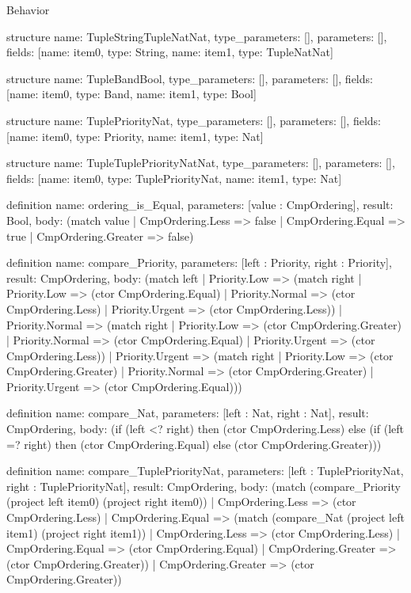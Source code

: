 \begin{lexlean}{Behavior}
\begin{semanticmodule}
structure{
  name: TupleStringTupleNatNat,
  type_parameters: [],
  parameters: [],
  fields: [{name: item0, type: String}, {name: item1, type: TupleNatNat}]
}

structure{
  name: TupleBandBool,
  type_parameters: [],
  parameters: [],
  fields: [{name: item0, type: Band}, {name: item1, type: Bool}]
}

structure{
  name: TuplePriorityNat,
  type_parameters: [],
  parameters: [],
  fields: [{name: item0, type: Priority}, {name: item1, type: Nat}]
}

structure{
  name: TupleTuplePriorityNatNat,
  type_parameters: [],
  parameters: [],
  fields: [{name: item0, type: TuplePriorityNat}, {name: item1, type: Nat}]
}

definition{
  name: ordering_is_Equal,
  parameters: [value : CmpOrdering],
  result: Bool,
  body: (match value
    | CmpOrdering.Less => false
    | CmpOrdering.Equal => true
    | CmpOrdering.Greater => false)
}

definition{
  name: compare_Priority,
  parameters: [left : Priority, right : Priority],
  result: CmpOrdering,
  body: (match left
    | Priority.Low => (match right
      | Priority.Low => (ctor CmpOrdering.Equal)
      | Priority.Normal => (ctor CmpOrdering.Less)
      | Priority.Urgent => (ctor CmpOrdering.Less))
    | Priority.Normal => (match right
      | Priority.Low => (ctor CmpOrdering.Greater)
      | Priority.Normal => (ctor CmpOrdering.Equal)
      | Priority.Urgent => (ctor CmpOrdering.Less))
    | Priority.Urgent => (match right
      | Priority.Low => (ctor CmpOrdering.Greater)
      | Priority.Normal => (ctor CmpOrdering.Greater)
      | Priority.Urgent => (ctor CmpOrdering.Equal)))
}

definition{
  name: compare_Nat,
  parameters: [left : Nat, right : Nat],
  result: CmpOrdering,
  body: (if (left <? right) then (ctor CmpOrdering.Less) else (if (left =? right) then (ctor CmpOrdering.Equal) else (ctor CmpOrdering.Greater)))
}

definition{
  name: compare_TuplePriorityNat,
  parameters: [left : TuplePriorityNat, right : TuplePriorityNat],
  result: CmpOrdering,
  body: (match (compare_Priority (project left item0) (project right item0))
    | CmpOrdering.Less => (ctor CmpOrdering.Less)
    | CmpOrdering.Equal => (match (compare_Nat (project left item1) (project right item1))
      | CmpOrdering.Less => (ctor CmpOrdering.Less)
      | CmpOrdering.Equal => (ctor CmpOrdering.Equal)
      | CmpOrdering.Greater => (ctor CmpOrdering.Greater))
    | CmpOrdering.Greater => (ctor CmpOrdering.Greater))
}


\end{semanticmodule}
\end{lexlean}
